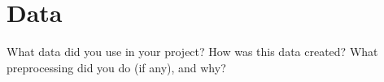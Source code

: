 \section{Data}
\label{sec:data}

What data did you use in your project? How was this data created? What preprocessing did you do (if any), and why?